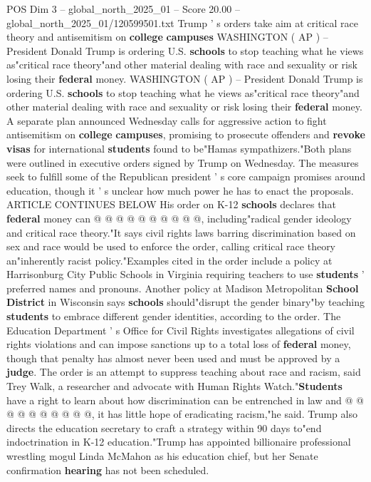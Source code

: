 \begin{textsample}{POS Dim 3 – global\_north\_2025\_01 – Score 20.00 – global\_north\_2025\_01/120599501.txt}  \label{ex:f3_pos_241}
Trump ' s orders take aim at critical race theory and antisemitism on \textbf{college} \textbf{campuses} WASHINGTON ( AP ) -- President Donald Trump is ordering U.S. \textbf{schools} to stop teaching what he views as"critical race theory"and other material dealing with race and sexuality or risk losing their \textbf{federal} money.
WASHINGTON ( AP ) -- President Donald Trump is ordering U.S. \textbf{schools} to stop teaching what he views as"critical race theory"and other material dealing with race and sexuality or risk losing their \textbf{federal} money.
A separate plan announced Wednesday calls for aggressive action to fight antisemitism on \textbf{college} \textbf{campuses}, promising to prosecute offenders and \textbf{revoke} \textbf{visas} for international \textbf{students} found to be"Hamas sympathizers."Both plans were outlined in executive orders signed by Trump on Wednesday.
The measures seek to fulfill some of the Republican president ' s core campaign promises around education, though it ' s unclear how much power he has to enact the proposals.
ARTICLE CONTINUES BELOW His order on K-12 \textbf{schools} declares that \textbf{federal} money can @ @ @ @ @ @ @ @ @ @, including"radical gender ideology and critical race theory."It says civil rights laws barring discrimination based on sex and race would be used to enforce the order, calling critical race theory an"inherently racist policy."Examples cited in the order include a policy at Harrisonburg City Public Schools in Virginia requiring teachers to use \textbf{students} ' preferred names and pronouns.
Another policy at Madison Metropolitan \textbf{School} \textbf{District} in Wisconsin says \textbf{schools} should"disrupt the gender binary"by teaching \textbf{students} to embrace different gender identities, according to the order.
The Education Department ' s Office for Civil Rights investigates allegations of civil rights violations and can impose sanctions up to a total loss of \textbf{federal} money, though that penalty has almost never been used and must be approved by a \textbf{judge}.
The order is an attempt to suppress teaching about race and racism, said Trey Walk, a researcher and advocate with Human Rights Watch."\textbf{Students} have a right to learn about how discrimination can be entrenched in law and @ @ @ @ @ @ @ @ @ @, it has little hope of eradicating racism,"he said.
Trump also directs the education secretary to craft a strategy within 90 days to"end indoctrination in K-12 education."Trump has appointed billionaire professional wrestling mogul Linda McMahon as his education chief, but her Senate confirmation \textbf{hearing} has not been scheduled.

\end{textsample}
